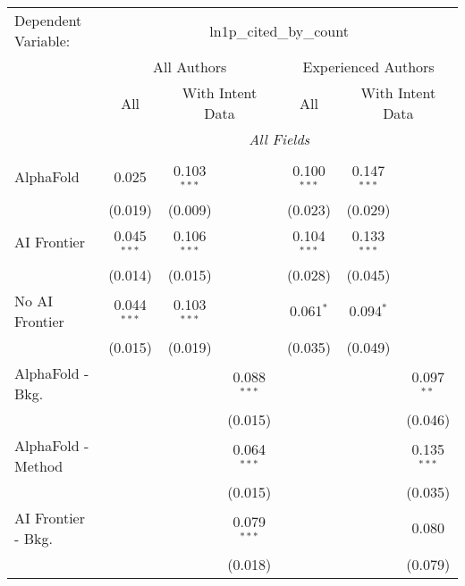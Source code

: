 \begingroup
\centering
\begin{tabular}{lcccccc}
   \tabularnewline \midrule \midrule
   Dependent Variable: & \multicolumn{6}{c}{ln1p\_cited\_by\_count}\\
 & \multicolumn{3}{c}{All Authors} & \multicolumn{3}{c}{Experienced Authors} \\
\cmidrule(lr){2-4} \cmidrule(lr){5-7}
 & \multicolumn{1}{c}{All} & \multicolumn{2}{c}{With Intent Data} & \multicolumn{1}{c}{All} & \multicolumn{2}{c}{With Intent Data} \\
\cmidrule(lr){2-2} \cmidrule(lr){3-4} \cmidrule(lr){5-5} \cmidrule(lr){6-7}
 & \multicolumn{6}{c}{\textit{All Fields}} \\ \\
   AlphaFold               & 0.025         & 0.103$^{***}$ &               & 0.100$^{***}$ & 0.147$^{***}$ &   \\   
                           & (0.019)       & (0.009)       &               & (0.023)       & (0.029)       &   \\   
   AI Frontier             & 0.045$^{***}$ & 0.106$^{***}$ &               & 0.104$^{***}$ & 0.133$^{***}$ &   \\   
                           & (0.014)       & (0.015)       &               & (0.028)       & (0.045)       &   \\   
   No AI Frontier          & 0.044$^{***}$ & 0.103$^{***}$ &               & 0.061$^{*}$   & 0.094$^{*}$   &   \\   
                           & (0.015)       & (0.019)       &               & (0.035)       & (0.049)       &   \\   
   AlphaFold - Bkg.        &               &               & 0.088$^{***}$ &               &               & 0.097$^{**}$\\   
                           &               &               & (0.015)       &               &               & (0.046)\\   
   AlphaFold - Method      &               &               & 0.064$^{***}$ &               &               & 0.135$^{***}$\\   
                           &               &               & (0.015)       &               &               & (0.035)\\   
   AI Frontier - Bkg.      &               &               & 0.079$^{***}$ &               &               & 0.080\\   
                           &               &               & (0.018)       &               &               & (0.079)\\   

\end{tabular}
